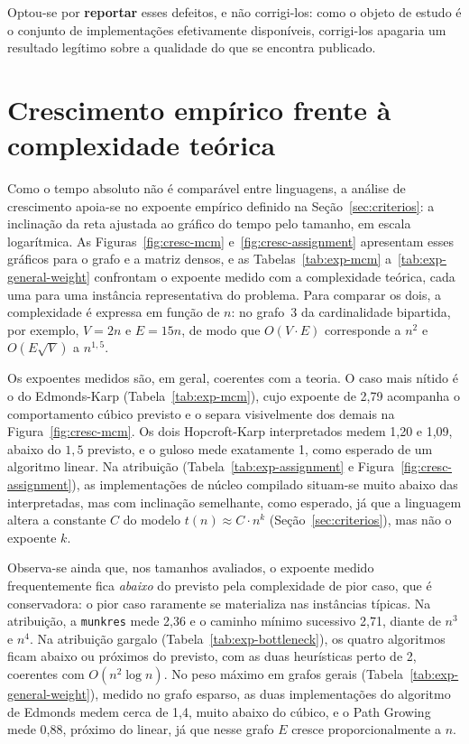 Optou-se por \textbf{reportar} esses defeitos, e não corrigi-los: como o objeto de
estudo é o conjunto de implementações efetivamente disponíveis, corrigi-los
apagaria um resultado legítimo sobre a qualidade do que se encontra publicado.

\section{Crescimento empírico frente à complexidade teórica}
\label{sec:crescimento}

Como o tempo absoluto não é comparável entre linguagens, a análise de crescimento
apoia-se no expoente empírico definido na Seção~\ref{sec:criterios}: a inclinação
da reta ajustada ao gráfico do tempo pelo tamanho, em escala logarítmica. As
Figuras~\ref{fig:cresc-mcm} e~\ref{fig:cresc-assignment} apresentam esses gráficos
para o grafo e a matriz densos, e as
Tabelas~\ref{tab:exp-mcm} a~\ref{tab:exp-general-weight} confrontam o expoente
medido com a complexidade teórica, cada uma para uma instância representativa do
problema. Para comparar os dois, a complexidade é expressa em função de $n$: no
grafo~3 da cardinalidade bipartida, por exemplo, $V = 2n$ e $E = 15n$, de modo que
$O(V \cdot E)$ corresponde a $n^2$ e $O(E\sqrt{V})$ a $n^{1{,}5}$.





Os expoentes medidos são, em geral, coerentes com a teoria. O caso mais nítido é
o do Edmonds-Karp (Tabela~\ref{tab:exp-mcm}), cujo expoente de 2{,}79 acompanha o
comportamento cúbico previsto e o separa visivelmente dos demais na
Figura~\ref{fig:cresc-mcm}. Os dois Hopcroft-Karp interpretados medem 1{,}20 e
1{,}09, abaixo do $1{,}5$ previsto, e o guloso mede exatamente 1, como esperado de
um algoritmo linear. Na atribuição (Tabela~\ref{tab:exp-assignment} e
Figura~\ref{fig:cresc-assignment}), as implementações de núcleo compilado situam-se
muito abaixo das interpretadas, mas com inclinação semelhante, como esperado, já que a linguagem altera a
constante $C$ do modelo $t(n) \approx C \cdot n^k$ (Seção~\ref{sec:criterios}),
mas não o expoente $k$.




Observa-se ainda que, nos tamanhos avaliados, o expoente medido frequentemente
fica \textit{abaixo} do previsto pela complexidade de pior caso, que é
conservadora: o pior caso raramente se materializa nas instâncias típicas. Na
atribuição, a \texttt{munkres} mede 2{,}36 e o caminho mínimo sucessivo 2{,}71,
diante de $n^3$ e $n^4$. Na atribuição gargalo (Tabela~\ref{tab:exp-bottleneck}),
os quatro algoritmos ficam abaixo ou próximos do previsto, com as duas heurísticas
perto de 2, coerentes com $O(n^2 \log n)$. No peso máximo em grafos gerais
(Tabela~\ref{tab:exp-general-weight}), medido no grafo esparso, as duas
implementações do algoritmo de Edmonds medem cerca de 1{,}4, muito abaixo do
cúbico, e o Path Growing mede 0{,}88, próximo do linear, já que nesse grafo $E$
cresce proporcionalmente a $n$.

